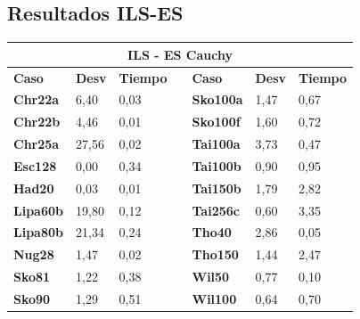 \documentclass[a4paper, 12pt]{article}
\begin{document}
      \subsection{Resultados ILS-ES}
      \begin{table}[H]
\centering
\begin{tabular}{|l|l|l|l|l|l|l|}
\hline
\multicolumn{7}{|c|}{\textbf{ILS - ES Cauchy}}                                                                      \\ \hline
\textbf{Caso}    & \textbf{Desv} & \textbf{Tiempo} & \textbf{} & \textbf{Caso}    & \textbf{Desv} & \textbf{Tiempo} \\ \cline{1-3} \cline{5-7} 
\textbf{Chr22a}  & 6,40          & 0,03            &           & \textbf{Sko100a} & 1,47          & 0,67            \\ \cline{1-3} \cline{5-7} 
\textbf{Chr22b}  & 4,46          & 0,01            &           & \textbf{Sko100f} & 1,60          & 0,72            \\ \cline{1-3} \cline{5-7} 
\textbf{Chr25a}  & 27,56         & 0,02            &           & \textbf{Tai100a} & 3,73          & 0,47            \\ \cline{1-3} \cline{5-7} 
\textbf{Esc128}  & 0,00          & 0,34            &           & \textbf{Tai100b} & 0,90          & 0,95            \\ \cline{1-3} \cline{5-7} 
\textbf{Had20}   & 0,03          & 0,01            &           & \textbf{Tai150b} & 1,79          & 2,82            \\ \cline{1-3} \cline{5-7} 
\textbf{Lipa60b} & 19,80         & 0,12            &           & \textbf{Tai256c} & 0,60          & 3,35            \\ \cline{1-3} \cline{5-7} 
\textbf{Lipa80b} & 21,34         & 0,24            &           & \textbf{Tho40}   & 2,86          & 0,05            \\ \cline{1-3} \cline{5-7} 
\textbf{Nug28}   & 1,47          & 0,02            &           & \textbf{Tho150}  & 1,44          & 2,47            \\ \cline{1-3} \cline{5-7} 
\textbf{Sko81}   & 1,22          & 0,38            &           & \textbf{Wil50}   & 0,77          & 0,10            \\ \cline{1-3} \cline{5-7} 
\textbf{Sko90}   & 1,29          & 0,51            &           & \textbf{Wil100}  & 0,64          & 0,70            \\ \cline{1-3} \cline{5-7} 
\end{tabular}
\end{table}
\end{document}
